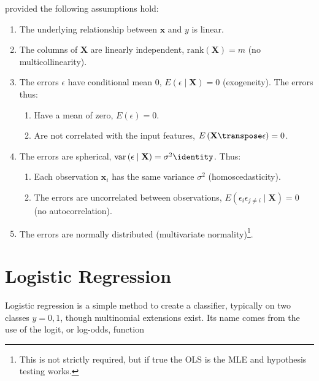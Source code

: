\noindent provided the following assumptions hold:

\begin{enumerate}[noitemsep]
\item The underlying relationship between $\mathbf{x}$ and $y$ is linear.
\item The columns of $\mathbf{X}$ are linearly independent, \ie $\mathrm{rank}\left(\mathbf{X}\right) = m$ (no multicollinearity).
\item The errors $\epsilon$ have conditional mean 0, $E\left(\epsilon \mid \mathbf{X}\right) = 0$ (exogeneity). The errors thus:
\begin{enumerate}[noitemsep]
\item Have a mean of zero, $E\left(\epsilon\right) = 0$.
\item Are not correlated with the input features, $E\left(\mathbf{X}\transpose\epsilon\right) = 0$.
\end{enumerate}
\item The errors are spherical, $\mathrm{var}\left(\epsilon \mid \mathbf{X}\right) = \sigma^{2} \identity$. Thus:
\begin{enumerate}[noitemsep]
\item Each observation $\mathbf{x}_{i}$ has the same variance $\sigma^{2}$ (homoscedasticity).
\item The errors are uncorrelated between observations, $E\left(\epsilon_{i}\epsilon_{j \neq i} \mid \mathbf{X}\right) = 0$ (no autocorrelation).
\end{enumerate}
\item The errors are normally distributed (multivariate normality)\footnote{This is not strictly required, but if true the OLS is the MLE and hypothesis testing works.}.
\end{enumerate}


\section{Logistic Regression}
\label{regression:logistic}

Logistic regression is a simple method to create a classifier,
typically on two classes $y = 0,1$, though multinomial extensions exist.
Its name comes from the use of the logit, or log-odds, function

